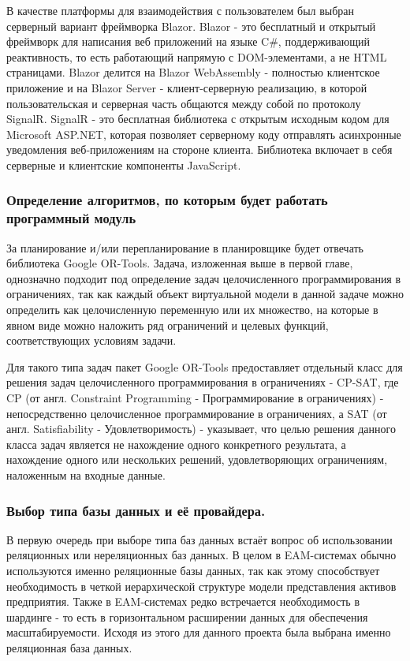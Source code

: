 В качестве платформы для взаимодействия с пользователем был выбран серверный вариант фреймворка Blazor. Blazor - это бесплатный и открытый фреймворк для написания веб приложений на языке C\#, поддерживающий реактивность, то есть работающий напрямую с DOM-элементами, а не HTML страницами. Blazor делится на Blazor WebAssembly - полностью клиентское приложение и на Blazor Server - клиент-серверную реализацию, в которой пользовательская и серверная часть общаются между собой по протоколу SignalR. SignalR - это бесплатная библиотека с открытым исходным кодом для Microsoft ASP.NET, которая позволяет серверному коду отправлять асинхронные уведомления веб-приложениям на стороне клиента. Библиотека включает в себя серверные и клиентские компоненты JavaScript.



\subsubsection{Определение алгоритмов, по которым будет работать программный модуль}

За планирование и/или перепланирование в планировщике будет отвечать библиотека Google OR-Tools. Задача, изложенная выше в первой главе, однозначно подходит под определение задач целочисленного программирования в ограничениях, так как каждый объект виртуальной модели в данной задаче можно определить как целочисленную переменную или их множество, на которые в явном виде можно наложить ряд ограничений и целевых функций, соответствующих условиям задачи.

Для такого типа задач пакет Google OR-Tools предоставляет отдельный класс для решения задач целочисленного программирования в ограничениях - CP-SAT, где CP (от англ. Constraint Programming - Программирование в ограничениях) - непосредственно целочисленное программирование в ограничениях, а SAT (от англ. Satisfiability - Удовлетворимость) - указывает, что целью решения данного класса задач является не нахождение одного конкретного результата, а нахождение одного или нескольких решений, удовлетворяющих ограничениям, наложенным на входные данные.
 
\subsubsection{Выбор типа базы данных и её провайдера.}

В первую очередь при выборе типа баз данных встаёт вопрос об использовании реляционных или нереляционных баз данных. В целом в EAM-системах обычно используются именно реляционные базы данных, так как этому способствует необходимость в четкой иерархической структуре модели представления активов предприятия. Также в EAM-системах редко встречается необходимость в шардинге - то есть в горизонтальном расширении данных для обеспечения масштабируемости. Исходя из этого для данного проекта была выбрана именно реляционная база данных.

